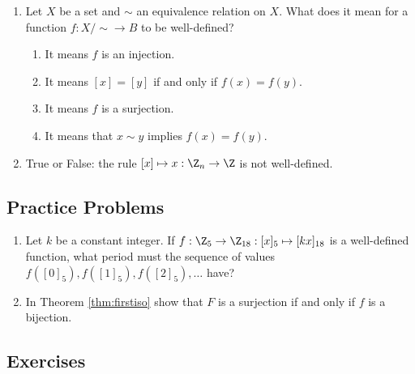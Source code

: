 \begin{enumerate}
\item Let $X$ be a set and $\sim$ an equivalence relation on $X$. What does it mean for a function $f : X/\sim \to B$ to be well-defined?
\begin{enumerate}
    \item It means $f$ is an injection.
    \item It means $[x] = [y]$ if and only if $f(x) = f(y)$.
    \item It means $f$ is a surjection.
    \item It means that $x \sim y$ implies $f(x) = f(y)$.
\end{enumerate}

\item True or False: the rule $[x] \mapsto x : \Z_n \to \Z$ is not well-defined.
\end{enumerate}

\subsection*{Practice Problems}

\begin{enumerate}\renewcommand{\labelenumi}{\thesubsection.\theenumi}
\item Let $k$ be a constant integer. If $f:\Z_5\to\Z_{18}:[x]_5\mapsto [kx]_{18}$ is a well-defined function, what period must the sequence of values $f([0]_5),f([1]_5),f([2]_5),\ldots$ have?

\item In Theorem \ref{thm:firstiso} show that $F$ is a surjection if and only if $f$ is a bijection.
\end{enumerate}

\subsection*{Exercises}

